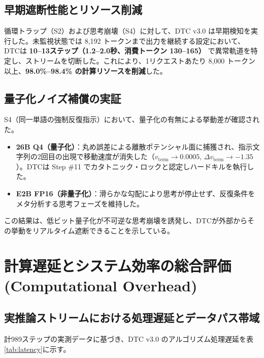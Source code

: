 \documentclass[11pt,a4paper]{article}
\begin{document}
\subsection{早期遮断性能とリソース削減}

循環トラップ（S2）および思考崩壊（S4）に対して、DTC v3.0 は早期検知を実行した。未監視状態では 8,192 トークンまで出力を継続する設定において、DTCは \textbf{10--13ステップ（1.2--2.0秒、消費トークン 130--165）} で異常軌道を特定し、ストリームを切断した。これにより、1リクエストあたり 8,000 トークン以上、\textbf{98.0\%--98.4\% の計算リソースを削減}した。

\subsection{量子化ノイズ補償の実証}

S4（同一単語の強制反復指示）において、量子化の有無による挙動差が確認された。
\begin{itemize}
    \item \textbf{26B Q4（量子化）}：丸め誤差による離散ポテンシャル面に捕獲され、指示文字列の2回目の出現で移動速度が消失した（$v_{\mathrm{term}} \to 0.0005$, $\Delta v_{\mathrm{term}} \to -1.35$）。DTCは Step \#11 でカタトニック・ロックと認定しハードキルを執行した。
    \item \textbf{E2B FP16（非量子化）}：滑らかな勾配により思考が停止せず、反復条件をメタ分析する思考フェーズを維持した。
\end{itemize}
この結果は、低ビット量子化が不可逆な思考崩壊を誘発し、DTCが外部からその挙動をリアルタイム遮断できることを示している。

\section{計算遅延とシステム効率の総合評価 (Computational Overhead)}

\subsection{実推論ストリームにおける処理遅延とデータパス帯域}

計989ステップの実測データに基づき、DTC v3.0 のアルゴリズム処理遅延を表\ref{tab:latency}に示す。
\end{document}
